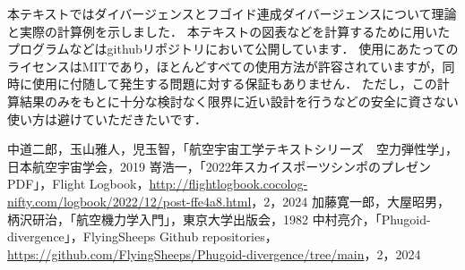 \documentclass{jarticle}
\begin{document}
本テキストではダイバージェンスとフゴイド連成ダイバージェンスについて理論と実際の計算例を示しました．
本テキストの図表などを計算するために用いたプログラムなどはgithubリポジトリ\cite{git}において公開しています．
使用にあたってのライセンスはMITであり，ほとんどすべての使用方法が許容されていますが，同時に使用に付随して発生する問題に対する保証もありません．
ただし，この計算結果のみをもとに十分な検討なく限界に近い設計を行うなどの安全に資さない使い方は避けていただきたいです．

\begin{thebibliography}{99}
     中道二郎，玉山雅人，児玉智，「航空宇宙工学テキストシリーズ　空力弾性学」，日本航空宇宙学会，2019
     嵜浩一，「2022年スカイスポーツシンポのプレゼンPDF」，Flight Logbook，\url{http://flightlogbook.cocolog-nifty.com/logbook/2022/12/post-ffe4a8.html}，2，2024
     加藤寛一郎，大屋昭男，柄沢研治，「航空機力学入門」，東京大学出版会，1982
     中村亮介，「Phugoid-divergence」，FlyingSheeps Github repositories，\url{https://github.com/FlyingSheeps/Phugoid-divergence/tree/main}，2，2024
\end{thebibliography}
\end{document}
